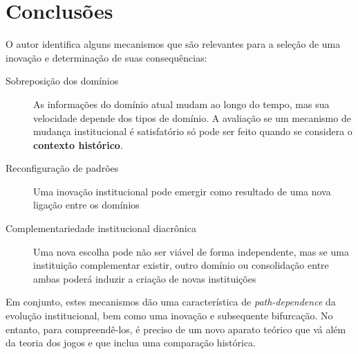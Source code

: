 \documentclass[9pt,twocolumn,twoside,lineno]{style}
\begin{document}
\section{Conclusões}

O autor identifica alguns mecanismos que são relevantes para a seleção de uma inovação e determinação de suas consequências:
\begin{description}
	\item[Sobreposição dos domínios] As informações do domínio atual mudam ao longo do tempo, mas sua velocidade depende dos tipos de domínio. A avaliação se um mecanismo de mudança institucional é satisfatório só pode ser feito quando se considera o \textbf{contexto histórico}.
	\item[Reconfiguração de padrões] Uma inovação institucional pode emergir como resultado de uma nova ligação entre os domínios
	\item[Complementariedade institucional diacrônica] Uma nova escolha pode não ser viável de forma independente, mas se uma instituição complementar existir, outro domínio ou consolidação entre ambas poderá induzir a criação de novas instituições
\end{description}
Em conjunto, estes mecanismos dão uma característica de \textit{path-dependence} da evolução institucional, bem como uma inovação e subsequente bifurcação. No entanto, para compreendê-los, é preciso de um novo aparato teórico que vá além da teoria dos jogos e que inclua uma comparação histórica.
\end{document}
